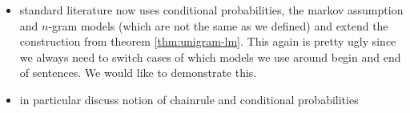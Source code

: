 \documentclass[•]{book}
\begin{document}
\begin{appendix}
\begin{itemize}
\item standard literature now uses conditional probabilities, the markov assumption and $n$-gram models (which are not the same as we defined) and extend the construction from theorem \ref{thm:unigram-lm}. This again is pretty ugly since we always need to switch cases of which models we use around begin and end of sentences. We would like to demonstrate this.
\item in particular discuss notion of chainrule and conditional probabilities
\end{itemize}

\end{appendix}

\glsaddall
\printnoidxglossaries



\end{document}

